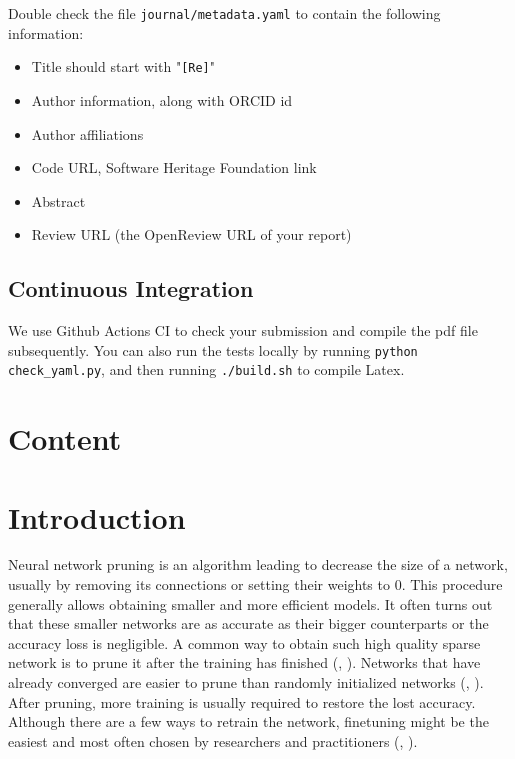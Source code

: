 Double check the file \texttt{journal/metadata.yaml} to contain the following information:

\begin{itemize}
\item Title should start with "\texttt{[Re]}"
\item Author information, along with ORCID id
\item Author affiliations
\item Code URL, Software Heritage Foundation link
\item Abstract
\item Review URL (the OpenReview URL of your report)
\end{itemize}

\subsection{Continuous Integration}

We use Github Actions CI to check your submission and compile the pdf file subsequently.
You can also run the tests locally by running \texttt{python check\_yaml.py}, and then running \texttt{./build.sh} to compile Latex.

\clearpage

\section{Content}


\newpage
\renewcommand{\arraystretch}{1.5}

\section{Introduction}

Neural network pruning is an algorithm leading to decrease the size of a network, usually by removing its connections or setting their weights to 0. 
This procedure generally allows obtaining smaller and more efficient models.
It often turns out that these smaller networks are as accurate as their bigger counterparts or the accuracy loss is negligible.
A common way to obtain such high quality sparse network is to prune it after the training has finished (\cite{rethinking}, \cite{Frankle}).
Networks that have already converged are easier to prune than randomly initialized networks (\cite{rethinking}, \cite{snip}).
After pruning, more training is usually required to restore the lost accuracy.
Although there are a few ways to retrain the network, finetuning might be the easiest and most often chosen by researchers and practitioners (\cite{rethinking}, \cite{Renda}).

